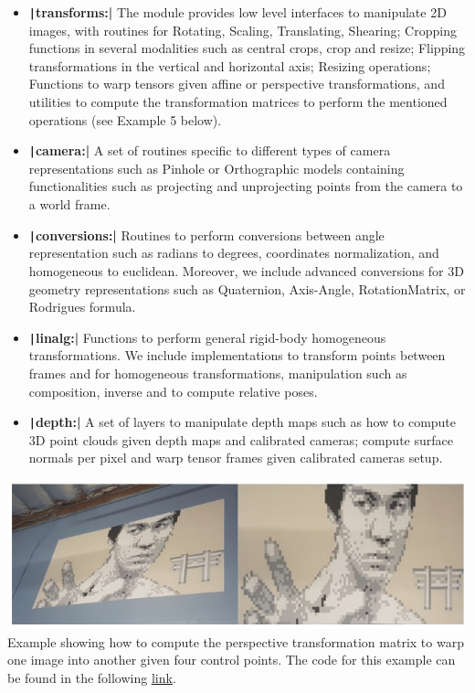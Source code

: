 \begin{itemize}
    \item \textbf{\texttt|transforms:|} The module provides low level interfaces to manipulate 2D images,  with routines for Rotating, Scaling, Translating, Shearing; Cropping functions in several modalities such as central crops, crop and resize; Flipping transformations in the vertical and horizontal axis; Resizing operations; Functions to warp tensors given affine or perspective transformations, and utilities to compute the transformation matrices to perform the mentioned operations (see Example 5 below).
    \item \textbf{\texttt|camera:|} A set of routines specific to different types of camera representations such as Pinhole or Orthographic models containing functionalities such as projecting and unprojecting points from the camera to a world frame.
    \item \textbf{\texttt|conversions:|} Routines to perform conversions between angle representation such as radians to degrees, coordinates normalization, and homogeneous to euclidean. Moreover, we include advanced conversions for 3D geometry representations such as Quaternion, Axis-Angle, RotationMatrix, or Rodrigues formula.
    \item \textbf{\texttt|linalg:|} Functions to perform general rigid-body homogeneous transformations. We include implementations to transform points between frames and for homogeneous transformations, manipulation such as composition, inverse and to compute relative poses.
    \item \textbf{\texttt|depth:|} A set of layers to manipulate depth maps such as how to compute 3D point clouds given depth maps and calibrated cameras; compute  surface normals per pixel and warp tensor frames given calibrated cameras setup.
\end{itemize}

\begin{tcolorbox}[every float=\centering, drop shadow, title=Example 5: Geometric Image transformation]
    \label{fig:examples:geometry}
    \includegraphics[width=1.\linewidth]{main/chapter03/data/examples/bruce_warped.jpg}
    {Example showing how to compute the perspective transformation matrix to warp one image into another given four control points. The code for this example can be found in the following \underline{\color{blue}\href{https://colab.research.google.com/drive/1TgRiOs9x0W98axsb9jDTnYul0pGCeGQv}{link}}.}
    \inputminted[python3, baselinestretch=1., style=vs, fontfamily=courier, fontsize=\footnotesize, funcnamehighlighting=true]{python}{main/chapter03/data/examples/snipet_geometry.py}
\end{tcolorbox}

